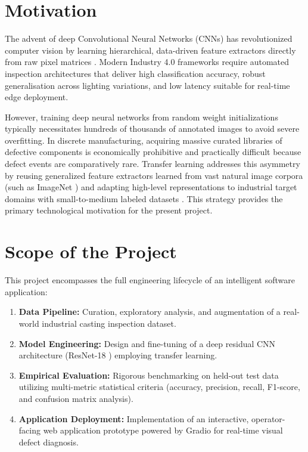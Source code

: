 \documentclass[12pt,a4paper]{report}
\begin{document}
\section{Motivation}
The advent of deep Convolutional Neural Networks (CNNs) has revolutionized computer vision by learning hierarchical, data-driven feature extractors directly from raw pixel matrices \cite{krizhevsky2012imagenet, simonyan2015very}. Modern Industry 4.0 frameworks require automated inspection architectures that deliver high classification accuracy, robust generalisation across lighting variations, and low latency suitable for real-time edge deployment.

However, training deep neural networks from random weight initializations typically necessitates hundreds of thousands of annotated images to avoid severe overfitting. In discrete manufacturing, acquiring massive curated libraries of defective components is economically prohibitive and practically difficult because defect events are comparatively rare. Transfer learning addresses this asymmetry by reusing generalized feature extractors learned from vast natural image corpora (such as ImageNet \cite{russakovsky2015imagenet}) and adapting high-level representations to industrial target domains with small-to-medium labeled datasets \cite{oquab2014learning}. This strategy provides the primary technological motivation for the present project.

\section{Scope of the Project}
This project encompasses the full engineering lifecycle of an intelligent software application:
\begin{enumerate}
    \item \textbf{Data Pipeline:} Curation, exploratory analysis, and augmentation of a real-world industrial casting inspection dataset.
    \item \textbf{Model Engineering:} Design and fine-tuning of a deep residual CNN architecture (ResNet-18 \cite{he2016deep}) employing transfer learning.
    \item \textbf{Empirical Evaluation:} Rigorous benchmarking on held-out test data utilizing multi-metric statistical criteria (accuracy, precision, recall, F1-score, and confusion matrix analysis).
    \item \textbf{Application Deployment:} Implementation of an interactive, operator-facing web application prototype powered by Gradio for real-time visual defect diagnosis.
\end{enumerate}
\end{document}

